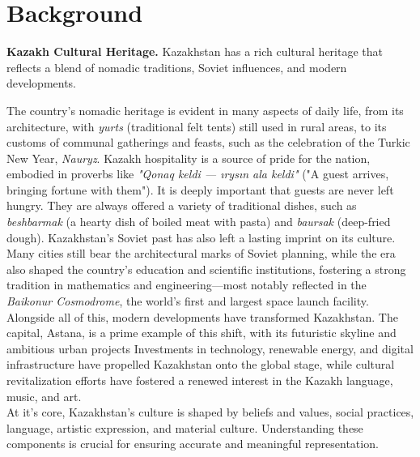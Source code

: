 \section{Background} 
\textbf{Kazakh Cultural Heritage.} Kazakhstan has a rich cultural heritage that reflects a blend of nomadic traditions, Soviet influences, and modern developments. 

The country’s nomadic heritage is evident in many aspects of daily life, from its architecture, with \textit{yurts} (traditional felt tents) still used in rural areas, to its customs of communal gatherings and feasts, such as the celebration of the Turkic New Year, \textit{Nauryz}. Kazakh hospitality is a source of pride for the nation, embodied in proverbs like \textit{"Qonaq keldi — ırysın ala keldi"} ("A guest arrives, bringing fortune with them"). It is deeply important that guests are never left hungry. They are always offered a variety of traditional dishes, such as \textit{beshbarmak} (a hearty dish of boiled meat with pasta) and \textit{baursak} (deep-fried dough). Kazakhstan’s Soviet past has also left a lasting imprint on its culture. Many cities still bear the architectural marks of Soviet planning, while the era also shaped the country’s education and scientific institutions, fostering a strong tradition in mathematics and engineering—most notably reflected in the \textit{Baikonur Cosmodrome}, the world’s first and largest space launch facility. Alongside all of this, modern developments have transformed Kazakhstan. The capital, Astana, is a prime example of this shift, with its futuristic skyline and ambitious urban projects Investments in technology, renewable energy, and digital infrastructure have propelled Kazakhstan onto the global stage, while cultural revitalization efforts have fostered a renewed interest in the Kazakh language, music, and art. \\
At it's core, Kazakhstan’s culture is shaped by beliefs and values, social practices, language, artistic expression, and material culture. Understanding these components is crucial for ensuring accurate and meaningful representation.

